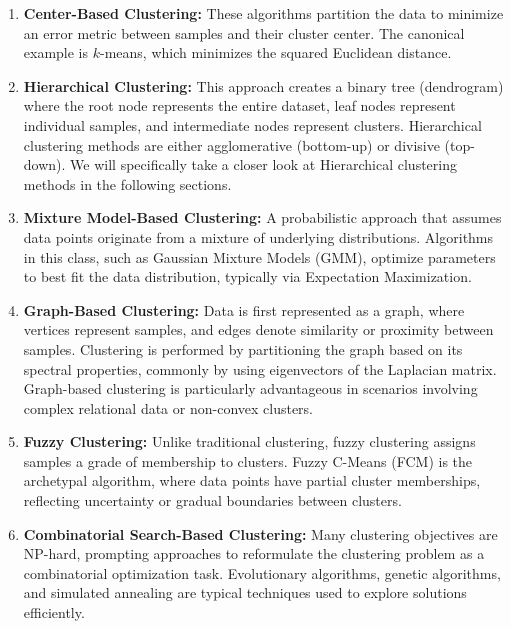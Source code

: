 \begin{enumerate}

    \item \textbf{Center-Based Clustering:} These algorithms partition the data to minimize an error metric between samples and their cluster center. The canonical example is \(k\)-means, which minimizes the squared Euclidean distance.

    \item \textbf{Hierarchical Clustering:} This approach creates a binary tree (dendrogram) where the root node represents the entire dataset, leaf nodes represent individual samples, and intermediate nodes represent clusters. Hierarchical clustering methods are either agglomerative (bottom-up) or divisive (top-down). We will specifically take a closer look at Hierarchical clustering methods in the following sections.

    \item \textbf{Mixture Model-Based Clustering:} A probabilistic approach that assumes data points originate from a mixture of underlying distributions. Algorithms in this class, such as Gaussian Mixture Models (GMM), optimize parameters to best fit the data distribution, typically via Expectation Maximization.

    \item \textbf{Graph-Based Clustering:} Data is first represented as a graph, where vertices represent samples, and edges denote similarity or proximity between samples. Clustering is performed by partitioning the graph based on its spectral properties, commonly by using eigenvectors of the Laplacian matrix. Graph-based clustering is particularly advantageous in scenarios involving complex relational data or non-convex clusters.

    \item \textbf{Fuzzy Clustering:} Unlike traditional clustering, fuzzy clustering assigns samples a grade of membership to clusters. Fuzzy C-Means (FCM) is the archetypal algorithm, where data points have partial cluster memberships, reflecting uncertainty or gradual boundaries between clusters.

    \item \textbf{Combinatorial Search-Based Clustering:} Many clustering objectives are NP-hard, prompting approaches to reformulate the clustering problem as a combinatorial optimization task. Evolutionary algorithms, genetic algorithms, and simulated annealing are typical techniques used to explore solutions efficiently.

\end{enumerate}

